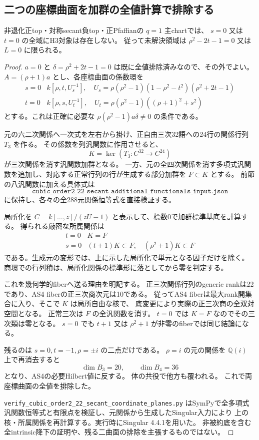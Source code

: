 \subsection{二つの座標曲面を加群の全値計算で排除する}
\begin{proposition}
非退化正top・対称secant負top・正Pfaffianの $q=1$ 主chartでは、
$s=0$ 又は $t=0$ の全域にH3対象は存在しない。
従って未解決領域は $\rho^2-2t-1=0$ 又は $L=0$ に限られる。
\end{proposition}
\begin{proof}
$a=0$ と $\delta=\rho^2+2t-1=0$ は既に全値排除済みなので、その外でよい。
$A=(\rho+1)a$ とし、各座標曲面の係数環を
\[
 \begin{array}{c|c}
 s=0&k[\rho,t,U_s^{-1}],\quad
 U_s=\rho(\rho^2-1)(1-\rho^2-t^2)(\rho^2+2t-1)\\
 t=0&k[\rho,s,U_t^{-1}],\quad
 U_t=\rho(\rho^2-1)((\rho+1)^2+s^2)
 \end{array}
\]
とする。これは正確に必要な $\rho(\rho^2-1)a\delta\ne0$ の条件である。

元の六二次関係へ一次式を左右から掛け、正自由三次32語への24行の関係行列 $T_3$ を作る。
その係数を列汎関数に作用させると、
\[
 K=\ker(T_3:C^{32}\longrightarrow C^{24})
\]
が三次関係を消す汎関数加群となる。
一方、元の全四次関係を消す多項式汎関数を追加し、対応する正常行列の行が生成する部分加群を $F\subset K$ とする。
前節の八汎関数に加える具体式は
\[
 \texttt{cubic\_order2\_22\_secant\_additional\_functionals\_input.json}
\]
に保持し、各々の全288元関係恒等式を直接検証する。

局所化を $C=k[\ldots,z]/(zU-1)$ と表示して、標数0で加群標準基底を計算する。
得られる厳密な所属関係は
\[
 \begin{array}{c|c}
 t=0&K=F\\
 s=0&(t+1)K\subset F,\quad(\rho^2+1)K\subset F
 \end{array}
\]
である。生成元の変形では、上に示した局所化で単元となる因子だけを除く。
商環での行列積は、局所化関係の標準形に落としてから零を判定する。

これを幾何学的fiberへ送る理由を明記する。
正三次関係行列のgeneric rankは22であり、AS4 fiberの正三次商次元は10である。
従ってAS4 fiberは最大rank開集合に入り、そこで $K$ は局所自由な核で、
底変更により実際の正三次商の全双対空間となる。
正常三次は $F$ の全汎関数を消す。
$t=0$ では $K=F$ なのでその三次類は零となる。
$s=0$ でも $t+1$ 又は $\rho^2+1$ が非零のfiberでは同じ結論になる。

残るのは $s=0,t=-1,\rho=\pm i$ の二点だけである。
$\rho=i$ の元の関係を $\mathbb Q(i)$ 上で再消去すると
\[
 \dim B_3=20,\qquad\dim B_4=36
\]
となり、AS4の必要Hilbert値に反する。
体の共役で他方も覆われる。
これで両座標曲面の全値を排除した。

\texttt{verify\_cubic\_order2\_22\_secant\_coordinate\_planes.py}
はSymPyで全多項式汎関数恒等式と有限点を検証し、元関係から生成したSingular入力により
上の核・所属関係を再計算する。実行時にSingular 4.4.1を用いた。
非被約底を含む全intrinsic降下の証明や、残る二曲面の排除を主張するものではない。
\end{proof}
